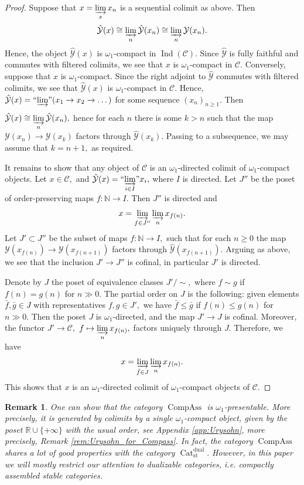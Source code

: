 \documentclass[11pt,leqno]{amsart}
\newtheorem{remark}[theo]{Remark}
\numberwithin{equation}{section}
\def\N{\mathbb{N}}
\def\R{\mathbb{R}}
\newcommand{\indlim}[1][]{\mathop{\varinjlim}\limits_{#1}}
\newcommand{\inddlim}[1][]{{``{\indlim[#1]}"}}
\newcommand{\Cat}{\operatorname{Cat}}
\newcommand{\st}{\operatorname{st}}
\newcommand{\dual}{\operatorname{dual}}
\newcommand{\cC}{{\mathcal C}}
\newcommand{\cY}{{\mathcal Y}}
\newcommand{\Compass}{\operatorname{CompAss}}
\newcommand{\Ind}{\operatorname{Ind}}
\begin{document}
\begin{proof}Suppose that $x=\indlim[x]x_n$ is a sequential colimit as above. Then $$\hat{\cY}(x)\cong\indlim[n]\hat{\cY}(x_n)\cong\indlim[n]\cY(x_n).$$ Hence, the object $\hat{\cY}(x)$ is $\omega_1$-compact in $\Ind(\cC).$ Since $\hat{\cY}$ is fully faithful and commutes with filtered colimits, we see that $x$ is $\omega_1$-compact in $\cC.$ Conversely, suppose that $x$ is $\omega_1$-compact. Since the right adjoint to $\hat{\cY}$ commutes with filtered colimits, we see that $\hat{\cY}(x)$ is $\omega_1$-compact in $\cC.$ Hence, $\hat{\cY}(x)=\inddlim(x_1\to x_2\to\dots)$ for some sequence $(x_n)_{n\geq 1}.$ Then $\hat{\cY}(x)\cong\indlim[n]\hat{\cY}(x_n),$ hence for each $n$ there is some $k>n$ such that the map $\cY(x_n)\to\cY(x_k)$ factors through $\hat{\cY}(x_k).$ Passing to a subsequence, we may assume that $k=n+1,$ as required.

It remains to show that any object of $\cC$ is an $\omega_1$-directed colimit of $\omega_1$-compact objects. Let $x\in\cC,$ and $\hat{\cY}(x)=\inddlim[i\in I]x_i,$ where $I$ is directed. Let $J''$ be the poset of order-preserving maps $f:\N\to I.$ Then $J''$ is directed and
$$x=\indlim[f\in J'']\indlim[n]x_{f(n)}.$$
Let $J'\subset J''$ be the subset of maps $f:\N\to I,$ such that for each $n\geq 0$ the map $\cY(x_{f(n)})\to\cY(x_{f(n+1)})$ factors through $\hat{\cY}(x_{f(n+1)}).$ Arguing as above, we see that the inclusion $J'\to J''$ is cofinal, in particular $J'$ is directed. 

Denote by $J$ the poset of equivalence classes $J'/\sim,$ where $f\sim g$ if $f(n)=g(n)$ for $n\gg 0.$ The partial order on $J$ is the following: given elements $\bar{f},\bar{g}\in J$ with representatives $f,g\in J',$ we have $\bar{f}\leq\bar{g}$ if $f(n)\leq g(n)$ for $n\gg 0.$ Then the poset $J$ is $\omega_1$-directed, and the map $J'\to J$ is cofinal. Moreover, the functor $J'\to \cC,$ $f\mapsto \indlim[n]x_{f(n)},$ factors uniquely through $J.$ Therefore, we have
$$x=\indlim[\bar{f}\in J]\indlim[n]x_{f(n)}.$$ This shows that $x$ is an $\omega_1$-directed colimit of $\omega_1$-compact objects of $\cC.$\end{proof}


\begin{remark} One can show that the category $\Compass$ is $\omega_1$-presentable. More precisely, it is generated by colimits by a single $\omega_1$-compact object, given by the poset $\R\cup\{+\infty\}$ with the usual order, see Appendix \ref{app:Urysohn}, more precisely, Remark \ref{rem:Urysohn_for_Compass}. In fact, the category $\Compass$ shares a lot of good properties with the category $\Cat_{\st}^{\dual}.$ However, in this paper we will mostly restrict our attention to dualizable categories, i.e. compactly assembled stable categories.\end{remark}
\end{document}
